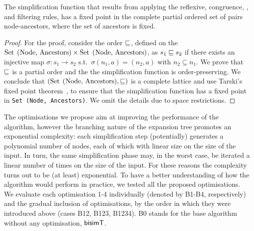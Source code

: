 \begin{theorem}
  \label{thm:fixed_point}
  The simplification function that results from applying the
  reflexive, congruence, \BPA, and filtering rules, has a fixed point
  in the complete partial ordered set of pairs node-ancestors, where
  the set of ancestors is 
  fixed.
\end{theorem}
%
\begin{proof}
For the proof, consider the order $\sqsubseteq$, defined on the
  $\text{\lstinline{Set (Node, Ancestors)}} \times
  \text{\lstinline{Set (Node, Ancestors)}}$, as $s_1 \sqsubseteq s_2$ if
  there exists an injective map
  $\sigma : s_1 \rightarrow s_2$ s.t.\ $\sigma(n_1,a) = (n_2,a)$ with
  $n_2\subseteq n_1$. We prove that $\sqsubseteq$ is a partial order and the 
  the simplification function is order-preserving. 
  We conclude that $(\text{\lstinline{Set (Node, Ancestors)}}, \leqSets)$ is
  a complete lattice and use Tarski's fixed point 
  theorem~\cite{tarski1955lattice}, to
  ensure that the simplification function has a fixed point in
  \lstinline{Set (Node, Ancestors)}.
  We omit the details due to space restrictions.
\end{proof}

The optimisations we propose aim at improving the performance of the
algorithm, however the branching nature of the expansion tree promotes
an exponential complexity: each simplification step (potentially)
generates a polynomial number of nodes, each of which with linear size
on the size of the input.  In turn, the same simplification phase may,
in the worst case, be iterated a linear number of times on the size of
the input.  For these reasons the complexity turns out to be (at least)
exponential.  
To have a better understanding of how the algorithm would perform
in practice, we tested all the proposed optimisations. We evaluate 
each optimisation 1-4 individually (denoted by B1-B4, respectively)
and the gradual inclusion of optimisations, by the order in which they were
introduced above (cases B12, B123, B1234).
B0 stands for the base algorithm without any optimisation, $\mathsf{bisimT}$.

